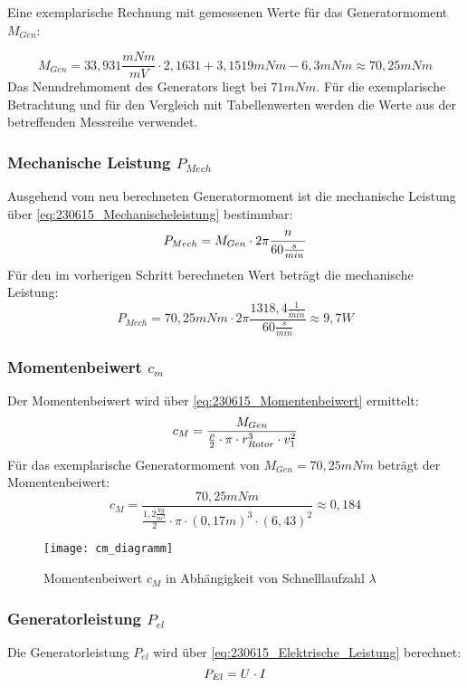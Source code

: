 Eine exemplarische Rechnung mit gemessenen Werte für das Generatormoment $M_{Gen}$:

$$M_{Gen} = 33,931\frac{mNm}{mV} \cdot 2,1631 + 3,1519 mNm - 6,3mNm \approx 70,25 mNm$$
Das Nenndrehmoment des Generators liegt bei $71 mNm$. Für die exemplarische Betrachtung und für den Vergleich mit Tabellenwerten werden die Werte aus der betreffenden Messreihe verwendet.
\subsubsection*{Mechanische Leistung $P_{Mech}$}
Ausgehend vom neu berechneten Generatormoment ist die mechanische Leistung über \autoref{eq:230615_Mechanischeleistung} bestimmbar:
\begin{equation}
    \centering
    P_{Mech} = M_{Gen} \cdot 2 \pi \frac{n}{60\frac{s}{min}}
    \label{eq:230615_Mechanischeleistung}
\end{equation}
Für den im vorherigen Schritt berechneten Wert beträgt die mechanische Leistung: 
$$P_{Mech} = 70,25mNm \cdot 2 \pi \frac{1318,4 \frac{1}{min}}{60\frac{s}{min}} \approx 9,7W$$

\subsubsection*{Momentenbeiwert $c_m$}
Der Momentenbeiwert wird über \autoref{eq:230615_Momentenbeiwert} ermittelt:
\begin{equation}
    \centering
    c_M = \frac{M_{Gen}}{ \frac{\rho}{2} \cdot \pi \cdot r_{Rotor}^3 \cdot v_1^2}
    \label{eq:230615_Momentenbeiwert}
\end{equation}
Für das exemplarische Generatormoment von $M_{Gen} = 70,25mNm$ beträgt der Momentenbeiwert:
$$c_M = \frac{70,25mNm}{ \frac{1,2 \frac{kg}{m^3}}{2} \cdot \pi \cdot (0,17 m)^3 \cdot (6,43)^2}\approx 0,184$$

\begin{figure}[H]
    \centering
    \texttt{[image: cm\_diagramm]}
    \caption{Momentenbeiwert $c_M$ in Abhängigkeit von Schnelllaufzahl $\lambda$}
    \label{fig:Momentenbeiwert}
\end{figure}

\subsubsection*{Generatorleistung $P_{el}$}
Die Generatorleistung $P_{el}$ wird über \autoref{eq:230615_Elektrische_Leistung} berechnet:
\begin{equation}
    \centering
    P_{El} = U \cdot I
    \label{eq:230615_Elektrische_Leistung}
\end{equation}

